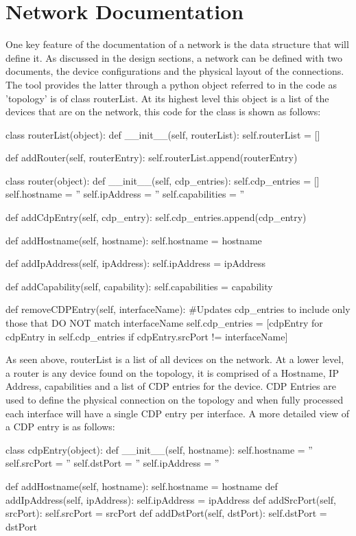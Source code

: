 \documentclass[11pt]{report}
\begin{document}
\section{Network Documentation}

One key feature of the documentation of a network is the data structure that will define it. As discussed in the design sections, a network can be defined with two documents, the device configurations and the physical layout of the connections. The tool provides the latter through a python object referred to in the code as 'topology' is of class routerList. At its highest level this object is a list of the devices that are on the network, this code for the class is shown as follows:

\begin{python}
	class routerList(object):
		def __init__(self, routerList):
			self.routerList = []
	
		def addRouter(self, routerEntry):
			self.routerList.append(routerEntry)
	
	class router(object):
		def __init__(self, cdp_entries):
			self.cdp_entries = []
			self.hostname = ''
			self.ipAddress = ''
			self.capabilities = ''
	
		def addCdpEntry(self, cdp_entry):
			self.cdp_entries.append(cdp_entry)
	
		def addHostname(self, hostname):
			self.hostname = hostname
	
		def addIpAddress(self, ipAddress):
			self.ipAddress = ipAddress
	
		def addCapability(self, capability):
			self.capabilities = capability
	
		def removeCDPEntry(self, interfaceName):
			#Updates cdp_entries to include only those that DO NOT match interfaceName
			self.cdp_entries = [cdpEntry for cdpEntry in self.cdp_entries if cdpEntry.srcPort != interfaceName]
\end{python}

As seen above, routerList is a list of all devices on the network. At a lower level, a router is any device found on the topology, it is comprised of a Hostname, IP Address, capabilities and a list of CDP entries for the device. CDP Entries are used to define the physical connection on the topology and when fully processed each interface will have a single CDP entry per interface. A more detailed view of a CDP entry is as follows:

\begin{python}
		class cdpEntry(object):
			def __init__(self, hostname):
				self.hostname = ''
				self.srcPort = ''
				self.dstPort = ''
				self.ipAddress = ''
		
			def addHostname(self, hostname):
				self.hostname = hostname
			def addIpAddress(self, ipAddress):
				self.ipAddress = ipAddress
			def addSrcPort(self, srcPort):
				self.srcPort = srcPort
			def addDstPort(self, dstPort):
				self.dstPort = dstPort
\end{python}
\end{document}
